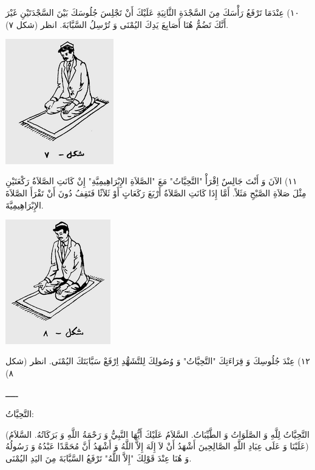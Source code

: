 \documentclass[a5paper]{article}
\begin{document}
١٠) عِنْدَمَا تَرْفَعُ رَأْسَكَ مِنَ السَّجْدَةِ الثَّانِيَةِ عَلَيْكَ أَنْ تَجْلِسَ جُلُوسَكَ بَيْنَ السَّجْدَتَيْنِ غَيْرَ أَنَّكَ تَضُمُّ هُنَا أَصَابِعَ يَدِكَ اليُمْنَى وَ تُرْسِلُ السَّبَّابَةَ. انظر (شكل ٧).

\begin{center}
\includegraphics[width=1.8583in,height=2.1417in]{MuhammadBagauddinlatinized-img349.png}
\end{center}
١١) الآنَ وَ أَنْتَ جَالِسٌ اِقْرَأْ "التَّحِيَّاتُ" مَعَ "الصَّلاَةِ الإِبْرَاهِيمِيَّةِ" إِنْ كَانَتِ الصَّلاَةُ رَكْعَتَيْنِ مِثْلَ صَلاَةِ الصَّبْحِ مَثَلاً. أَمَّا إِذَا كَانَتِ الصَّلاَةُ أَرْبَعَ رَكَعَاتٍ أَوْ ثَلاَثًا فَتَقِفُ دُونَ أَنْ تَقْرَأَ الصَّلاَةَ الإِبْرَاهِيمِيَّةَ. 

\begin{center}
\includegraphics[width=1.802in,height=2.1319in]{MuhammadBagauddinlatinized-img350.png}
\end{center}
١٢) عِنْدَ جُلُوسِكَ وَ قِرَاءَتِكَ "التَّحِيَّاتُ" وَ وُصُولِكَ لِلتَّشَهُّدِ اِرْفَعْ سَبَّابَتَكَ اليُمْنَى. انظر (شكل ٨)

ـــــ

التَّحِيَّاتُ:

(التَّحِيَّاتُ لِلَّهِ وَ الصَّلَوَاتُ وَ الطَّيِّبَاتُ. السَّلاَمُ عَلَيْكَ أَيُّهَا النَّبِيُّ وَ رَحْمَةُ اللَّهِ وَ بَرَكَاتُهُ. السَّلاَمُ عَلَيْنَا وَ عَلَى عِبَادِ اللَّهِ الصَّالِحِينَ أَشْهَدُ أَنْ لاَ إِلَهَ إِلاَّ اللَّهُ وَ أَشْهَدُ أَنَّ مُحَمَّدًا عَبْدُهُ وَ رَسُولُهُ) وَ هُنَا عِنْدَ قَوْلِكَ "إِلاَّ اللَّهُ" تَرْفَعُ السَّبَّابَةَ مِنَ اليَدِ اليُمْنَى.
\end{document}
